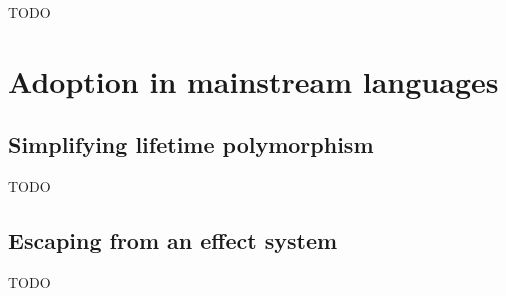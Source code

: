 \documentclass[acmsmall]{acmart}
\begin{document}


TODO %



%





\section{Adoption in mainstream languages} \label{sec:mainstream}


\subsection{Simplifying lifetime polymorphism} \label{subsec:lifetime-elision}


TODO %

\subsection{Escaping from an effect system}




TODO %
\end{document}
